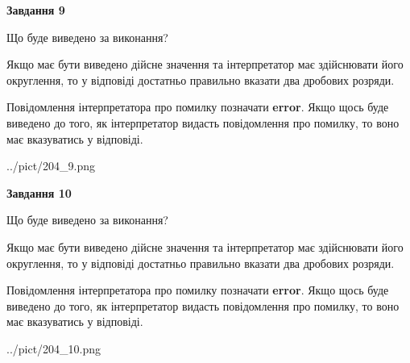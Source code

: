 \documentclass[12pt, ukrainian]{article}
\begin{document}
{\begin {Large}
{\begin {center}\textbf{Завдання 9}\end {center}}\par
Що буде виведено за виконання? \par

Якщо має бути виведено дійсне значення та інтерпретатор має здійснювати його округлення, 
то у відповіді достатньо правильно вказати два дробових розряди.

Повідомлення інтерпретатора про помилку позначати \textbf{error}.
Якщо щось буде виведено до того, як інтерпретатор видасть повідомлення про помилку, 
то воно має вказуватись у відповіді. \par

\begin{center}
	{../pict/204_9.png}
\end{center}
\newpage

{\begin {center}\textbf{Завдання 10}\end {center}}\par
Що буде виведено за виконання? \par

Якщо має бути виведено дійсне значення та інтерпретатор має здійснювати його округлення, 
то у відповіді достатньо правильно вказати два дробових розряди.

Повідомлення інтерпретатора про помилку позначати \textbf{error}.
Якщо щось буде виведено до того, як інтерпретатор видасть повідомлення про помилку, 
то воно має вказуватись у відповіді. \par

\begin{center}
	{../pict/204_10.png}
\end{center}
\newpage

\end {Large}}
\end{document}
